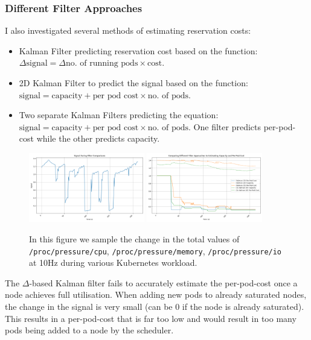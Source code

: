 \subsubsection{Different Filter Approaches}
I also investigated several methods of estimating reservation costs:
\begin{itemize}
    \item Kalman Filter predicting reservation cost based on the function:
        $\Delta \text{signal} = \Delta \text{no. of running pods} \times
        \text{cost}$.
    \item 2D Kalman Filter to predict the signal based on the function:
        $\text{signal} = \text{capacity} + \text{per pod cost} \times \text{no.
        of pods}$.
    \item Two separate Kalman Filters predicting the equation: $\text{signal} =
        \text{capacity} + \text{per pod cost} \times \text{no. of pods}$. One
        filter predicts per-pod-cost while the other predicts capacity.
\end{itemize}

\begin{figure}[H]
    \centering
    \includegraphics[width=0.45\textwidth]{images/filter-signal.png}
    \includegraphics[width=0.45\textwidth]{images/filter-comparison.png}
    \caption{In this figure we sample the change in the total values of
    \texttt{/proc/pressure/cpu}, \texttt{/proc/pressure/memory},
    \texttt{/proc/pressure/io} at 10Hz during various Kubernetes workload.}
    \label{fig:filter-evaluation}
\end{figure}

The $\Delta$-based Kalman filter fails to accurately estimate the per-pod-cost
once a node achieves full utilisation. When adding new pods to already saturated
nodes, the change in the signal is very small (can be 0 if the node is already
saturated). This results in a per-pod-cost that is far too low and would result
in too many pods being added to a node by the scheduler.

